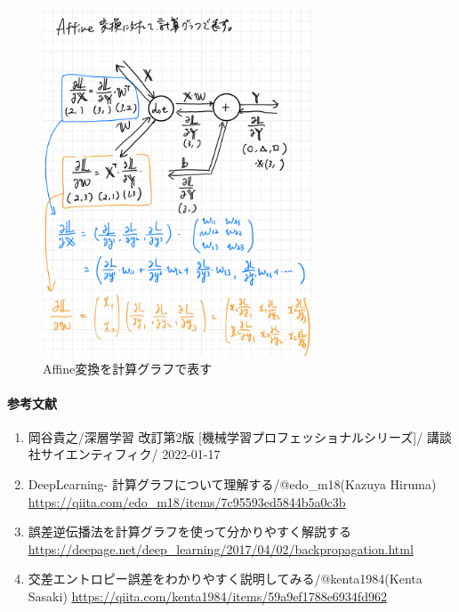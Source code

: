 \documentclass{ltjsarticle}
\begin{document}
\begin{figure}[htbp]
  \centering
  \includegraphics[width=8cm]{./capture/affine_calc_graph.png}
  \caption{Affine変換を計算グラフで表す}
  \label{fig:affine_calc_graph}
\end{figure}
  
\newpage

\paragraph{参考文献}
\begin{enumerate}
  \item 岡谷貴之/深層学習 改訂第2版 [機械学習プロフェッショナルシリーズ]/ 講談社サイエンティフィク/ 2022-01-17
  \item DeepLearning- 計算グラフについて理解する/@edo\_m18(Kazuya Hiruma) \url{https://qiita.com/edo_m18/items/7c95593ed5844b5a0c3b}
  \item 誤差逆伝播法を計算グラフを使って分かりやすく解説する \url{https://deepage.net/deep\_learning/2017/04/02/backpropagation.html}
  \item 交差エントロピー誤差をわかりやすく説明してみる/@kenta1984(Kenta Sasaki) \url{https://qiita.com/kenta1984/items/59a9ef1788e6934fd962}
\end{enumerate}

\newpage
\end{document}
